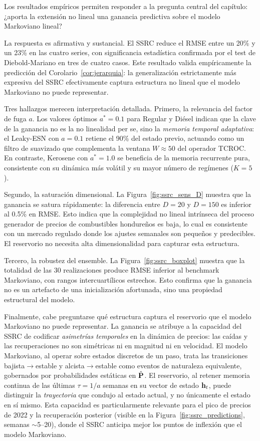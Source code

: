 Los resultados empíricos permiten responder a la pregunta central del
capítulo: ¿aporta la extensión no lineal una ganancia predictiva
sobre el modelo Markoviano lineal?

La respuesta es afirmativa y sustancial.  El SSRC reduce el RMSE
entre un 20\% y un 23\% en las cuatro series, con significancia
estadística confirmada por el test de Diebold-Mariano en tres de
cuatro casos.  Este resultado valida empíricamente la predicción del
Corolario~\ref{cor:jerarquia}: la generalización estrictamente más
expresiva del SSRC efectivamente captura estructura no lineal que el
modelo Markoviano no puede representar.

Tres hallazgos merecen interpretación detallada.  Primero, la
relevancia del factor de fuga $a$.  Los valores óptimos $a^* = 0.1$
para Regular y Diésel indican que la clave de la ganancia no es la
no linealidad per se, sino la \emph{memoria temporal adaptativa}:
el Leaky-ESN con $a = 0.1$ retiene el 90\% del estado previo,
actuando como un filtro de suavizado que complementa la ventana
$W \approx 50$ del operador TCROC.  En contraste, Kerosene con
$a^* = 1.0$ se beneficia de la memoria recurrente pura, consistente
con su dinámica más volátil y su mayor número de regímenes ($K = 5$).

Segundo, la saturación dimensional.  La
Figura~\ref{fig:ssrc_sens_D} muestra que la ganancia se satura
rápidamente: la diferencia entre $D = 20$ y $D = 150$ es inferior al
0.5\% en RMSE.  Esto indica que la complejidad no lineal intrínseca
del proceso generador de precios de combustibles hondureños es baja,
lo cual es consistente con un mercado regulado donde los ajustes
semanales son pequeños y predecibles.  El reservorio no necesita alta
dimensionalidad para capturar esta estructura.

Tercero, la robustez del ensemble.  La
Figura~\ref{fig:ssrc_boxplot} muestra que la totalidad de las 30
realizaciones produce RMSE inferior al benchmark Markoviano, con
rangos intercuartílicos estrechos.  Esto confirma que la ganancia no
es un artefacto de una inicialización afortunada, sino una propiedad
estructural del modelo.

Finalmente, cabe preguntarse qué estructura captura el reservorio que
el modelo Markoviano no puede representar.  La ganancia se atribuye a
la capacidad del SSRC de codificar \emph{asimetrías temporales} en la
dinámica de precios: las caídas y las recuperaciones no son simétricas
ni en magnitud ni en velocidad.  El modelo Markoviano, al operar sobre
estados discretos de un paso, trata las transiciones bajista$\to$estable
y alcista$\to$estable como eventos de naturaleza equivalente, gobernados
por probabilidades estáticas en $\hat{\mathbf{P}}$.  El reservorio, al
retener memoria continua de las últimas $\tau = 1/a$ semanas en su
vector de estado $\mathbf{h}_t$, puede distinguir la \emph{trayectoria}
que condujo al estado actual, y no únicamente el estado en sí mismo. Esta
capacidad es particularmente relevante para el pico de precios de
2022 y la recuperación posterior (visible en la
Figura~\ref{fig:ssrc_predictions}, semanas $\sim$5--20), donde el
SSRC anticipa mejor los puntos de inflexión que el modelo
Markoviano.

